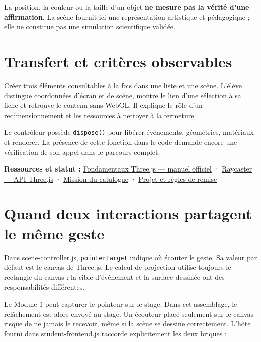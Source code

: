 \documentclass[
  canadien,
  11pt,
  a4paper,
]{report}
\begin{document}
La position, la couleur ou la taille d'un objet \textbf{ne mesure pas la
vérité d'une affirmation}. La scène fournit ici une représentation
artistique et pédagogique ; elle ne constitue pas une simulation
scientifique validée.

\section{Transfert et critères
observables}\label{transfert-et-crituxe8res-observables-2}

Créer trois éléments consultables à la fois dans une liste et une scène.
L'élève distingue coordonnées d'écran et de scène, montre le lien d'une
sélection à sa fiche et retrouve le contenu sans WebGL. Il explique le
rôle d'un redimensionnement et les ressources à nettoyer à la fermeture.

Le contrôleur possède \texttt{dispose()} pour libérer événements,
géométries, matériaux et renderer. La présence de cette fonction dans le
code demande encore une vérification de son appel dans le parcours
complet.

\textbf{Ressources et statut :}
\href{https://threejs.org/manual/\#en/fundamentals}{Fondamentaux
Three.js --- manuel officiel} ·
\href{https://threejs.org/docs/\#api/en/core/Raycaster}{Raycaster ---
API Three.js} ·
\href{../../../../../packages/learning/src/catalog.ts}{Mission du
catalogue} · \href{../../PROJECT.md}{Projet et règles de remise}

\section{Quand deux interactions partagent le même
geste}\label{quand-deux-interactions-partagent-le-muxeame-geste}

Dans
\href{../../frontend/module-3/scene-controller.js}{scene-controller.js},
\texttt{pointer\allowbreak{}Target} indique où écouter le geste. Sa valeur par défaut
est le canvas de Three.js. Le calcul de projection utilise toujours le
rectangle du canvas : la cible d'événement et la surface dessinée ont
des responsabilités différentes.

Le Module 1 peut capturer le pointeur sur le stage. Dans cet assemblage,
le relâchement est alors envoyé au stage. Un écouteur placé seulement
sur le canvas risque de ne jamais le recevoir, même si la scène se
dessine correctement. L'hôte fourni dans
\href{../../assembly/src/student-frontend.js}{student-frontend.js}
raccorde explicitement les deux briques :
\end{document}
